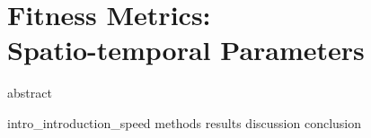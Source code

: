 \chapter{Fitness Metrics: \\  Spatio-temporal Parameters}
\label{chapter:Speed}
\glsresetall
{abstract}



\clearpage
{intro_introduction_speed}
{methods}
{results}
{discussion}
{conclusion}

